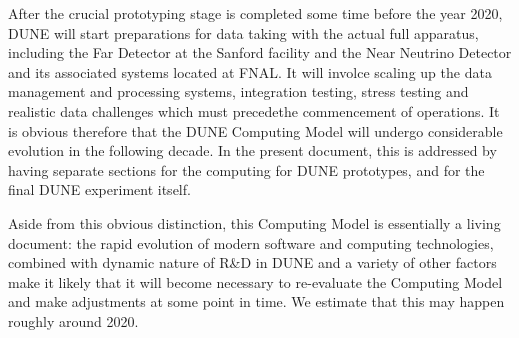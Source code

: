 After the crucial prototyping stage is completed some time before the year 2020, DUNE will start preparations for data taking with the
actual full apparatus, including the Far Detector at the Sanford facility and the Near Neutrino Detector and its associated systems
located at FNAL. It will involce scaling up the data management and processing systems,
integration testing,  stress testing and  realistic data challenges which must precedethe commencement of operations.
It is obvious therefore that the DUNE Computing Model will undergo considerable evolution in the following decade. In the present document,
this is addressed  by having separate sections for the computing for DUNE prototypes, and for the final DUNE experiment itself.

Aside from this obvious distinction, this Computing Model is essentially a living document: 
the rapid evolution of modern software and computing technologies, combined with dynamic nature of R\&D in DUNE
and a variety of other factors make it likely that it will become necessary to re-evaluate the Computing Model and make adjustments at
some point in time. We estimate that this may happen roughly around 2020.


